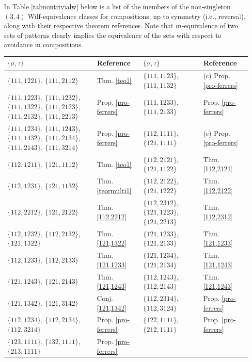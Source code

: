 \documentclass[11pt]{amsart}
\theoremstyle{plain}
\theoremstyle{definition}
\begin{document}
In Table \ref{tabnontrivialw} below is a list of the members of the non-singleton $(3,4)$ Wilf-equivalence classes for compositions, up to symmetry (i.e., reversal), along with their respective theorem references.  Note that $m$-equivalence of two sets of patterns clearly implies the equivalence of the sets with respect to avoidance in compositions. \pagebreak

\begin{table}[htp]
\begin{tabular}{|p{4.15cm}|p{2.6cm}||p{4.15cm}|p{3.6cm}|} \hline
  $\{\sigma,\tau\}$&Reference&$\{\sigma,\tau\}$&Reference\\\hline\hline
$\{111,1221\}$, $\{111,2112\}$&Thm. \ref{teo1}&
$\{111,1123\}$, $\{111,1132\}$&(c) Prop. \ref{pro-ferrers}\\\hline
$\{111,1223\}$, $\{111,1232\}$, $\{111,1322\}$, $\{111,2123\}$, $\{111,2132\}$, $\{111,2213\}$&Prop. \ref{pro-ferrers}&
$\{111,1233\}$, $\{111,2133\}$&Prop. \ref{pro-ferrers}\\\hline
$\{111,1234\}$, $\{111,1243\}$, $\{111,1432\}$, $\{111,2134\}$, $\{111,2143\}$, $\{111,3214\}$&Prop. \ref{pro-ferrers}&
$\{112,1111\}$, $\{121,1111\}$&(c) Prop. \ref{pro-ferrers}\\\hline
$\{112,1211\}$, $\{121,1112\}$&Thm. \ref{teo1}&
$\{112,2121\}$, $\{121,1122\}$&Thm. \ref{112,2121}\\\hline
$\{112,1231\}$, $\{121,1132\}$&Thm. \ref{teormulti1}&
$\{112,2122\}$, $\{121,1222\}$&Thm. \ref{112,2122}\\\hline
$\{112,2212\}$, $\{121,2122\}$&Thm. \ref{112,2212}&
$\{112,2312\}$, $\{121,1223\}$, $\{121,2213\}$&Thm. \ref{112,2312}\\\hline
$\{112,1232\}$, $\{112,2132\}$, $\{121,1322\}$&Thm. \ref{121,1322}&
$\{121,1233\}$, $\{121,2133\}$&Thm. \ref{121,1233} \\\hline
$\{112,1233\}$, $\{112,2133\}$&Thm. \ref{121,1233} &
$\{121,1234\}$, $\{121,2134\}$&Thm. \ref{121,1243}\\\hline
$\{121,1243\}$, $\{121,2143\}$&Thm. \ref{121,1243}&
$\{112,1243\}$, $\{112,2143\}$&Thm. \ref{121,1243}\\\hline
$\{121,1342\}$, $\{121,3142\}$&Conj. \ref{121,1342}&
$\{112,2314\}$, $\{112,3124\}$&Prop. \ref{pro-ferrers}\\\hline
$\{112,1234\}$, $\{112,2134\}$, $\{112,3214\}$&Prop. \ref{pro-ferrers}&
$\{122,1111\}$, $\{212,1111\}$&Prop. \ref{pro-ferrers}\\\hline
$\{123,1111\}$, $\{132,1111\}$, $\{213,1111\}$&Prop. \ref{pro-ferrers}&

\end{tabular}
\end{table}
\end{document}
